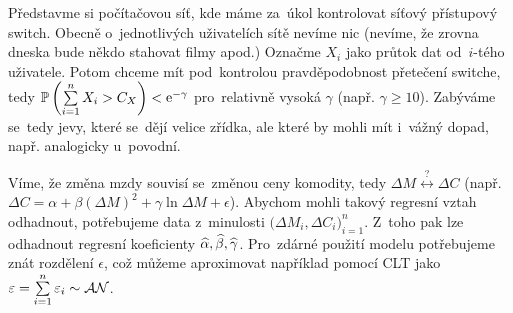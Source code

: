 \begin{example}[MEX] Představme si počítačovou síť, kde máme za~úkol kontrolovat síťový přístupový switch. Obecně o~jednotlivých uživatelích sítě nevíme nic (nevíme, že zrovna dneska bude někdo stahovat filmy apod.) Označme $X_i$ jako průtok dat od~$i$-tého uživatele. Potom chceme mít pod~kontrolou pravděpodobnost přetečení switche, tedy $\mathbb{P}\left( \sum\limits_{i=1}^{n} X_i>C_X \right)<\mathrm{e}^{-\gamma}$ pro~relativně vysoká $\gamma$ (např. $\gamma\geq 10$). Zabýváme se~tedy jevy, které se~dějí velice zřídka, ale které by mohli mít i~vážný dopad, např. analogicky u~povodní. 
\end{example}
\begin{example}[Ekonometrie]
	Víme, že změna mzdy souvisí se~změnou ceny komodity, tedy $\Delta M \stackrel{?}{\leftrightarrow}\Delta C$ (např. $\Delta C=\alpha+\beta(\Delta M)^2+\gamma\ln\Delta M+\epsilon$). Abychom mohli takový regresní vztah odhadnout, potřebujeme data z~minulosti $\big(\Delta M_i,\Delta C_i\big)_{i=1}^n$. Z~toho pak lze odhadnout regresní koeficienty $\widehat{\alpha},\widehat{\beta},\widehat{\gamma}$. Pro~zdárné použití modelu potřebujeme znát rozdělení $\epsilon$, což můžeme aproximovat například pomocí CLT jako $\varepsilon=\sum\limits_{i=1}^{n} \varepsilon_i\sim\mathcal{AN}$.
\end{example}


